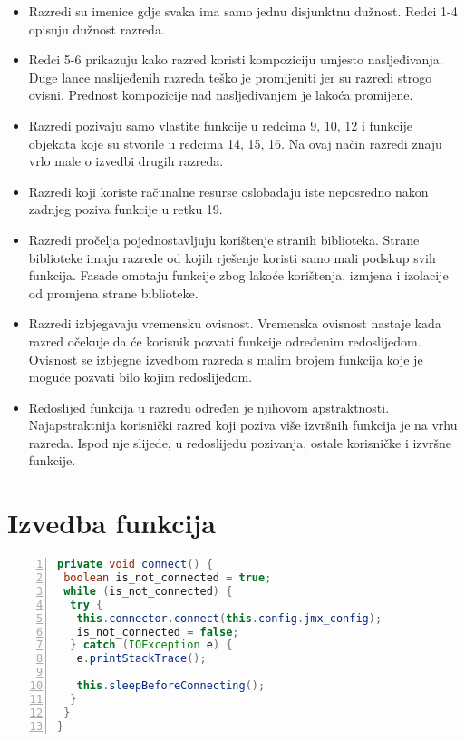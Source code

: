 \documentclass[utf8, diplomski, lmodern, numeric]{fer}
\begin{document}
\begin{itemize}
    \item Razredi su imenice gdje svaka ima samo jednu disjunktnu dužnost. Redci 1-4 opisuju dužnost razreda.
    \item Redci 5-6 prikazuju kako razred koristi kompoziciju umjesto nasljeđivanja. Duge lance naslijeđenih razreda teško je promijeniti jer su razredi strogo ovisni. Prednost kompozicije nad nasljeđivanjem je lakoća promijene.
    \item Razredi pozivaju samo vlastite funkcije u redcima 9, 10, 12 i funkcije objekata koje su stvorile u redcima 14, 15, 16. Na ovaj način razredi znaju vrlo male o izvedbi drugih razreda.
    \item Razredi koji koriste računalne resurse oslobađaju iste neposredno nakon zadnjeg poziva funkcije u retku 19.
    \item Razredi pročelja pojednostavljuju korištenje stranih biblioteka. Strane biblioteke imaju razrede od kojih rješenje koristi samo mali podskup svih funkcija. Fasade omotaju funkcije zbog lakoće korištenja, izmjena i izolacije od promjena strane biblioteke.
    \item Razredi izbjegavaju vremensku ovisnost. Vremenska ovisnost nastaje kada razred očekuje da će korisnik pozvati funkcije određenim redoslijedom. Ovisnost se izbjegne izvedbom razreda s malim brojem funkcija koje je moguće pozvati bilo kojim redoslijedom.
    \item Redoslijed funkcija u razredu određen je njihovom apstraktnosti. Najapstraktnija korisnički razred koji poziva više izvršnih funkcija je na vrhu razreda. Ispod nje slijede, u redoslijedu pozivanja, ostale korisničke i izvršne funkcije.
\end{itemize}


\section{Izvedba funkcija}

\begin{lstlisting}[floatplacement=H, language=Java, caption={Izvadak iz razreda JMX Connector Facade}, captionpos=b, basicstyle=\footnotesize, numbers=left, stepnumber=1, backgroundcolor=\color{backcolour}, keywordstyle=\color{blue}]
private void connect() {
 boolean is_not_connected = true;
 while (is_not_connected) {
  try {
   this.connector.connect(this.config.jmx_config);
   is_not_connected = false;
  } catch (IOException e) {
   e.printStackTrace();
      
   this.sleepBeforeConnecting();
  }
 }
}
\end{lstlisting}
\end{document}

